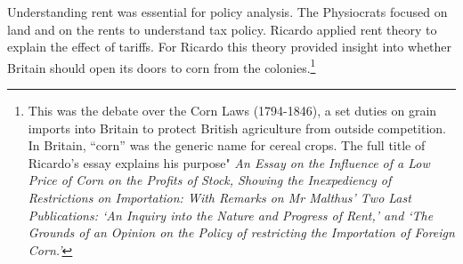Understanding rent was essential for policy analysis. The Physiocrats focused on land and on the rents to understand tax policy. Ricardo applied rent theory to explain the effect of tariffs. For Ricardo this theory provided insight into whether Britain should open its doors to corn from the colonies.\footnote{ This was the debate over the Corn Laws (1794-1846), a set duties on grain imports into Britain to protect British agriculture from outside competition. In Britain, ``corn'' was the generic name for cereal crops. The full title of Ricardo's essay explains his purpose" \textit{An Essay on the Influence of a Low Price of Corn on the Profits of Stock, Showing the Inexpediency of Restrictions on Importation: With Remarks on Mr Malthus' Two Last Publications: `An Inquiry into the Nature and Progress of Rent,' and `The Grounds of an Opinion on the Policy of restricting the Importation of Foreign Corn.'} }




